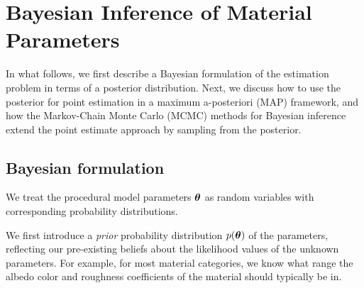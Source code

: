 \section{Bayesian Inference of Material Parameters}
\label{sec:bayesian}
%



In what follows, we first describe a Bayesian formulation of the estimation problem in terms of a posterior distribution. Next, we discuss how to use the posterior for point estimation in a maximum a-posteriori (MAP) framework, and how the Markov-Chain Monte Carlo (MCMC) methods for Bayesian inference extend the point estimate approach by sampling from the posterior.


\subsection{Bayesian formulation}
\label{ssec:point_sec}
%
We treat the procedural model parameters $\bm{\theta}$ as random variables with corresponding probability distributions.

We first introduce a \emph{prior} probability distribution $p(\bm{\theta})$ of the parameters, reflecting our pre-existing beliefs about the likelihood values of the unknown parameters. For example, for most material categories, we know what range the albedo color and roughness coefficients of the material should typically be in.

